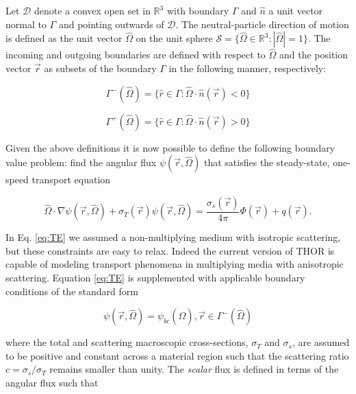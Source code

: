Let \( \mathcal{D} \) denote a convex open set in $\mathbb{R}^3$ with boundary $\Gamma$ and $\hat{n}$ a unit vector normal to $\Gamma$ and pointing outwards of \( \mathcal{D} \).
The neutral-particle direction of motion is defined as the unit vector $\hat{\Omega}$ on the unit sphere $\mathcal{S} = \{ \hat{\Omega} \in \mathbb{R}^3:|\hat{\Omega}| = 1 \}$.
The incoming and outgoing boundaries are defined with respect to $\hat{\Omega}$ and the position vector $\Vec{r}$ as subsets of the boundary $\Gamma$ in the following manner, respectively:

\begin{equation}
\Gamma^- (\hat{\Omega}) = \{ \hat{r} \in \Gamma : \hat{\Omega} \cdot \hat{n}(\Vec{r}) < 0 \}
\end{equation}

\begin{equation}
\Gamma^+ (\hat{\Omega}) = \{ \hat{r} \in \Gamma : \hat{\Omega} \cdot \hat{n}(\Vec{r}) > 0 \}
\end{equation}

Given the above definitions it is now possible to define the following boundary value problem: find the angular flux $\psi ( \Vec{r}, \hat{\Omega} )$ that satisfies the steady-state, one-speed transport equation

\begin{equation} \label{eq:TE}
\hat{\Omega} \cdot \nabla \psi ( \Vec{r} , \hat{\Omega} ) + \sigma _T ( \Vec{r} ) \psi ( \Vec{r} , \hat{\Omega} ) = \frac{\sigma_s (\Vec{r})}{4 \pi} \Phi ( \Vec{r} ) + q ( \Vec{r} ) .
\end{equation}

In Eq. \ref{eq:TE} we assumed a non-multiplying medium with isotropic scattering, but these constraints are easy to relax.
Indeed the current version of \ac{THOR} is capable of modeling transport phenomena in multiplying media with anisotropic scattering.
Equation \ref{eq:TE} is supplemented with applicable boundary conditions of the standard form

\begin{equation}
    \psi ( \Vec{r} , \hat{\Omega} ) = \psi_{bc} ( \hat{\Omega} ) , \Vec{r} \in \Gamma^- ( \hat{\Omega} )
\end{equation}

\noindent where the total and scattering macroscopic cross-sections, $\sigma_T$ and $\sigma_s$, are assumed to be positive and constant across a material region such that the scattering ratio $c = \sigma_s / \sigma_T $ remains smaller than unity.
The \textit{scalar} flux is defined in terms of the angular flux such that

